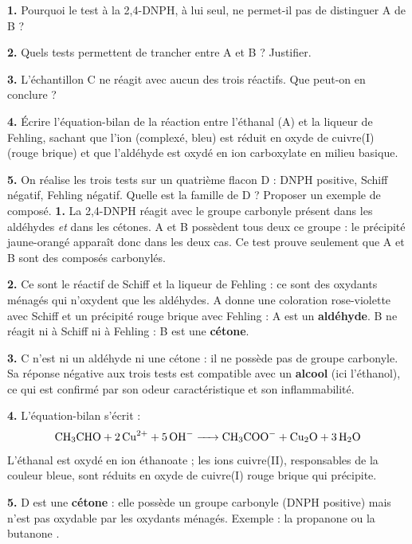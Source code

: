 \documentclass[11pt]{article}
\newcommand{\cle}[1]{{\popxbold\color{popdark}#1}}
\newcounter{popsec}
\newcounter{popsub}
\newcommand{\courssub}[1]{%
  \stepcounter{popsub}%
  \par\vspace{9pt}\noindent{\popxbold\fontsize{11.5}{13}\selectfont\color{popink}{\color{poporange}\thepopsec.\thepopsub}\hspace{6pt}#1}\par\nopagebreak\vspace{4pt}
}
\begin{document}
\begin{exoresolu}
\textbf{1.} Pourquoi le test à la 2,4-DNPH, à lui seul, ne permet-il pas de distinguer A de B ?

\textbf{2.} Quels tests permettent de trancher entre A et B ? Justifier.

\textbf{3.} L'échantillon C ne réagit avec aucun des trois réactifs. Que peut-on en conclure ?

\textbf{4.} Écrire l'équation-bilan de la réaction entre l'éthanal (A) et la liqueur de Fehling, sachant que l'ion  (complexé, bleu) est réduit en oxyde de cuivre(I)  (rouge brique) et que l'aldéhyde est oxydé en ion carboxylate  en milieu basique.

\textbf{5.} On réalise les trois tests sur un quatrième flacon D : DNPH positive, Schiff négatif, Fehling négatif. Quelle est la famille de D ? Proposer un exemple de composé.
\tcblower
\textbf{1.} La 2,4-DNPH réagit avec le groupe carbonyle  présent dans les aldéhydes \emph{et} dans les cétones. A et B possèdent tous deux ce groupe : le précipité jaune-orangé apparaît donc dans les deux cas. Ce test prouve seulement que A et B sont des \cle{composés carbonylés}.

\textbf{2.} Ce sont le réactif de Schiff et la liqueur de Fehling : ce sont des oxydants ménagés qui n'oxydent que les aldéhydes. A donne une coloration rose-violette avec Schiff et un précipité rouge brique avec Fehling : A est un \textbf{aldéhyde}. B ne réagit ni à Schiff ni à Fehling : B est une \textbf{cétone}.

\textbf{3.} C n'est ni un aldéhyde ni une cétone : il ne possède pas de groupe carbonyle. Sa réponse négative aux trois tests est compatible avec un \textbf{alcool} (ici l'éthanol), ce qui est confirmé par son odeur caractéristique et son inflammabilité.

\textbf{4.} L'équation-bilan s'écrit :
\[ \ce{CH3CHO + 2 Cu^{2+} + 5 OH- -> CH3COO- + Cu2O + 3 H2O} \]
L'éthanal est oxydé en ion éthanoate ; les ions cuivre(II), responsables de la couleur bleue, sont réduits en oxyde de cuivre(I) rouge brique qui précipite.

\textbf{5.} D est une \textbf{cétone} : elle possède un groupe carbonyle (DNPH positive) mais n'est pas oxydable par les oxydants ménagés. Exemple : la propanone  ou la butanone .
\end{exoresolu}

\courssub{Conclusion}
\end{document}
